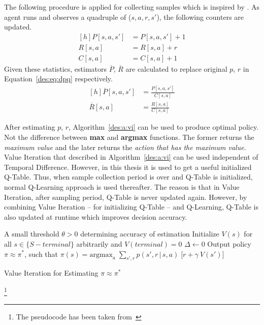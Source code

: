 The following procedure is applied for collecting samples which is inspired by \textcite{dutreilh:hal-01122123}. As agent runs and observes a quadruple of ($s,a,r,s'$), the following counters are updated.
\begin{equation}
\begin{aligned}[h]
P[s,a,s'] &= P[s,a,s'] + 1\\
R[s,a] &= R[s,a] + r \\
C[s,a] &= C[s,a] + 1
\end{aligned}
\end{equation}
Given these statistics, estimators $\overline{P}$, $\overline{R}$ are calculated to replace original $p$, $r$ in Equation~\ref{des:eq:dpq} respectively.
\begin{equation}
\begin{aligned}[h]
\overline{P}[s,a,s'] &= \frac{P[s,a,s']}{C[s,a]} \\
\overline{R}[s,a] &= \frac{R[s,a]}{C[s,a]}
\end{aligned}
\end{equation}

After estimating $p$, $r$, Algorithm~\ref{des:a:vi} can be used to produce optimal policy. Not the difference between \textbf{max} and \textbf{argmax} functions. The former returns the \emph{maximum value} and the later returns the \emph{action that has the maximum value}. Value Iteration that described in Algorithm~\ref{des:a:vi} can be used independent of Temporal Difference. However, in this thesis it is used to get a useful initialized Q-Table. Thus, when sample collection period is over and Q-Table is initialized, normal Q-Learning approach is used thereafter. The reason is that in Value Iteration, after sampling period, Q-Table is never updated again. However, by combining Value Iteration -- for initializing Q-Table -- and Q-Learning, Q-Table is also updated at runtime which improves decision accuracy.
\begin{algorithm}[h]
	\DontPrintSemicolon
	A small threshold $\theta > 0$ determining accuracy of estimation\;
	Initialize $V(s)$ for all $s \in \{S - terminal\}$ arbitrarily and $V(terminal) = 0$\;
	\BlankLine
	\Repeat{$\Delta < \theta$} {
		$\Delta \gets 0$\;
		\BlankLine
		Output policy $\pi \approx \pi^*$, such that\;
		$\pi(s) = \text{argmax}_a\;\sum_{s',r} p(s',r\,|\,s,a)\;\Big[r + \gamma\:V(s')\Big]$
	}
	\caption[Value Iteration for Estimating $\pi \approx \pi^*$]{Value Iteration for Estimating $\pi \approx \pi^*$\footnotemark}
	\label{des:a:vi}
\end{algorithm}
\footnote{The pseudocode has been taken from~\textcite{rlIntro}}
